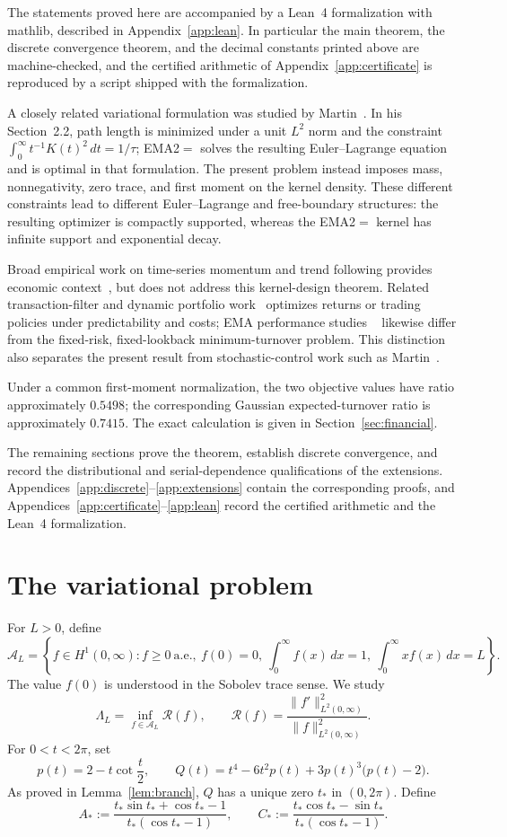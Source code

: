 \documentclass[11pt]{article}
\theoremstyle{definition}
\theoremstyle{remark}
\newcommand{\A}{\mathcal A}
\newcommand{\Rcal}{\mathcal R}
\begin{document}
The statements proved here are accompanied by a Lean~4 formalization with
mathlib, described in Appendix~\ref{app:lean}. In particular the main theorem,
the discrete convergence theorem, and the decimal constants printed above are
machine-checked, and the certified arithmetic of
Appendix~\ref{app:certificate} is reproduced by a script shipped with the
formalization.

A closely related variational formulation was studied by Martin~\cite{Martin2021}.
In his Section~2.2, path length is minimized under
a unit $L^2$ norm and the constraint
$\int_0^\infty t^{-1}K(t)^2\,dt=1/\tau$; EMA2$=$ solves the resulting
Euler--Lagrange equation and is optimal in that formulation. The present problem
instead imposes mass, nonnegativity, zero trace, and first moment on the kernel
density. These different constraints lead to different Euler--Lagrange and
free-boundary structures: the resulting optimizer is compactly supported, whereas
the EMA2$=$ kernel has infinite support and exponential decay.

Broad empirical work on time-series momentum and trend following provides
economic context~\cite{MoskowitzOoiPedersen,HurstOoiPedersen}, but does not
address this kernel-design theorem. Related transaction-filter and dynamic
portfolio work~\cite{BalversWu,GarleanuPedersen} optimizes returns or trading
policies under predictability and costs; EMA performance studies
~\cite{GrebenkovSerror,ZakamulinGiner} likewise differ from the fixed-risk,
fixed-lookback minimum-turnover problem. This distinction also separates the
present result from stochastic-control work such as Martin~\cite{Martin2012}.

Under a common first-moment normalization, the two objective values have ratio
approximately $0.5498$; the corresponding Gaussian expected-turnover ratio is
approximately $0.7415$. The exact calculation is given in
Section~\ref{sec:financial}.

The remaining sections prove the theorem, establish discrete convergence, and
record the distributional and serial-dependence qualifications of the extensions.
Appendices~\ref{app:discrete}--\ref{app:extensions} contain the corresponding
proofs, and Appendices~\ref{app:certificate}--\ref{app:lean} record the certified
arithmetic and the Lean~4 formalization.

\section{The variational problem}
For $L>0$, define
\[
\A_L=\left\{f\in H^1(0,\infty):
 f\geq0\ \text{a.e.},\ f(0)=0,\
 \int_0^\infty f(x)\,dx=1,\
 \int_0^\infty xf(x)\,dx=L\right\}.
\]
The value $f(0)$ is understood in the Sobolev trace sense. We study
\[
 \Lambda_L=\inf_{f\in\A_L}\Rcal(f),\qquad
 \Rcal(f)=\frac{\|f'\|_{L^2(0,\infty)}^2}{\|f\|_{L^2(0,\infty)}^2}.
\]
For $0<t<2\pi$, set
\[
 p(t)=2-t\cot\frac t2,
 \qquad
 Q(t)=t^4-6t^2p(t)+3p(t)^3\bigl(p(t)-2\bigr).
\]
As proved in Lemma~\ref{lem:branch}, $Q$ has a unique zero $t_*$ in
$(0,2\pi)$. Define
\[
 A_*:=\frac{t_*\sin t_*+\cos t_*-1}{t_*(\cos t_*-1)},
 \qquad
 C_*:=\frac{t_*\cos t_*-\sin t_*}{t_*(\cos t_*-1)}.
\]
\end{document}
